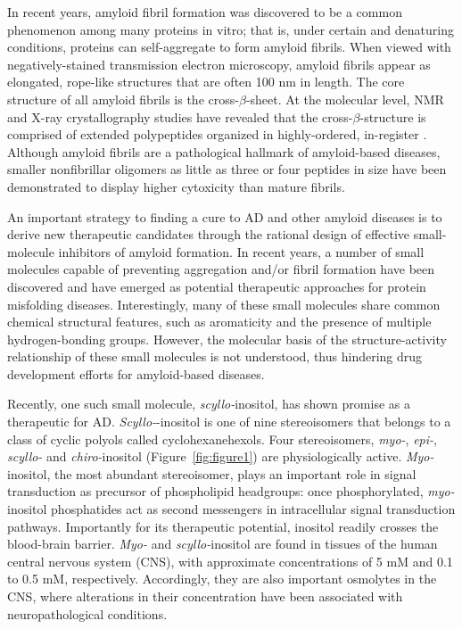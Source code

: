 In recent years, amyloid fibril formation was discovered to be a common phenomenon among many proteins in vitro; that is, under certain and denaturing conditions, proteins can self-aggregate to form amyloid fibrils.\cite{Chiti:2006p20} When viewed with negatively-stained transmission electron microscopy, amyloid fibrils appear as elongated, rope-like structures that are often 100 nm in length.\cite{Chiti:2006p20} The core structure of all amyloid fibrils is the cross-$\beta$-sheet.\cite{Chiti:2006p20,Serpell:2000p39} At the molecular level, NMR\cite{Balbach:2000p49,Petkova:2006p48} and X-ray crystallography\cite{Sawaya:2007p11} studies have revealed that the cross-$\beta$-structure is comprised of extended polypeptides organized in highly-ordered, in-register \bsheets. Although amyloid fibrils are a pathological hallmark of amyloid-based diseases, smaller nonfibrillar oligomers as little as three or four peptides in size have been demonstrated to display higher cytoxicity than mature fibrils.\cite{Gong:2003p22,Bitan:2003p10,Caughey:2009p5,Keshet:2010p61,Kitamura:2010p6,Lambert:1998p60,Selkoe:2008p16}

An important strategy to finding a cure to AD and other amyloid diseases is to derive new therapeutic candidates through the rational design of effective small-molecule inhibitors of amyloid formation. In recent years, a number of small molecules capable of preventing aggregation and/or fibril formation have been discovered and have emerged as potential therapeutic approaches for protein misfolding diseases.\cite{Frid:2007p65,Hawkes:2009p9,LeVine:2009p38,Necula:2007p42,ScherzerAttali:2010p63,Sood:2009p14} Interestingly, many of these small molecules share common chemical structural features, such as aromaticity and the presence of multiple hydrogen-bonding groups.\cite{Ehrnhoefer:2008p8,Liu:2009p18,Liu:2005p7,Porat:2006p33} However, the molecular basis of the structure-activity relationship of these small molecules is not understood, thus hindering drug development efforts for amyloid-based diseases.

Recently, one such small molecule, \textit{scyllo-}inositol, has shown promise as a therapeutic for AD.\cite{McLaurin:2006p29,McLaurin:2000p64} \textit{Scyllo-}-inositol is one of nine stereoisomers that belongs to a class of cyclic polyols called cyclohexanehexols. Four stereoisomers, \textit{myo-}, \textit{epi-}, \textit{scyllo-} and \textit{chiro-}inositol (Figure~\ref{fig:figure1}) are physiologically active.\cite{Fisher:2002p62} \textit{Myo-}inositol, the most abundant stereoisomer, plays an important role in signal transduction as precursor of phospholipid headgroups: once phosphorylated, \textit{myo-}inositol phosphatides act as second messengers in intracellular signal transduction pathways.\cite{Fisher:2002p62} Importantly for its therapeutic potential, inositol readily crosses the blood-brain barrier. \textit{Myo-} and \textit{scyllo-}inositol are found in tissues of the human central nervous system (CNS), with approximate concentrations of 5 mM and 0.1 to 0.5 mM, respectively.\cite{Michaelis:1993p89} Accordingly, they are also important osmolytes in the CNS, where alterations in their concentration have been associated with neuropathological conditions.\cite{Fisher:2002p62,Michell:2008p4}
 
